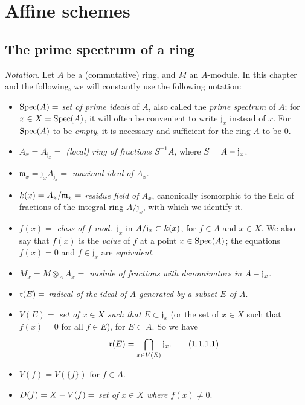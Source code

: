 \setcounter{section}{0}
\section{Affine schemes}
\label{section:I.1}

\setcounter{subsection}{0}
\subsection{The prime spectrum of a ring}
\label{subsection:I.1.1}

\begin{env}[1.1.1]
\label{I.1.1.1}
\emph{Notation}. Let $A$ be a (commutative) ring, and $M$ an $A$-module.
In this chapter and the following, we will constantly use the following notation:
\begin{itemize}
  \item $\operatorname{Spec}(A)=$ \emph{set of prime ideals} of $A$, also called the \emph{prime spectrum} of $A$; for $x\in X=\operatorname{Spec}(A)$, it will often be convenient to write $\mathfrak{j}_x$ instead of $x$.
    For $\operatorname{Spec}(A)$ to be \emph{empty}, it is necessary and sufficient for the ring $A$ to be $0$.
  \item $A_x=A_{\mathfrak{j}_x}=$ \emph{(local) ring of fractions $S^{-1}A$}, where $S=A-\mathfrak{j}_x$.
  \item $\mathfrak{m}_x=\mathfrak{j}_x A_{\mathfrak{j}_x}=$ \emph{maximal ideal of $A_x$}.
  \item $k(x)=A_x/\mathfrak{m}_x=$ \emph{residue field of $A_x$}, canonically isomorphic to the field of fractions of the integral ring $A/\mathfrak{j}_x$, with which we identify it.
  \item $f(x)=$ \emph{class of $f$ mod.~$\mathfrak{j}_x$} in $A/\mathfrak{j}_x\subset k(x)$, for $f\in A$ and $x\in X$.
    We also say that $f(x)$ is the \emph{value} of $f$ at a point $x\in\operatorname{Spec}(A)$; the equations $f(x)=0$ and $f\in\mathfrak{j}_x$ are \emph{equivalent}.
  \item $M_x=M\otimes_A A_x=$ \emph{module of fractions with denominators in $A-\mathfrak{j}_x$}.
  \item $\mathfrak{r}(E)=$ \emph{radical of the ideal of $A$ generated by a subset $E$ of $A$}.
  \item $V(E)=$ \emph{set of $x\in X$ such that $E\subset\mathfrak{j}_x$} (or the set of $x\in X$ such that $f(x)=0$ for all $f\in E$), for $E\subset A$.
    So we have
    \[
    \label{I.1.1.1.1}
      \mathfrak{r}(E)=\bigcap_{x\in V(E)}\mathfrak{j}_x.
      \tag{1.1.1.1}
    \]
  \item $V(f)=V(\{f\})$ for $f\in A$.
  \item $D(f)=X- V(f)=$ \emph{set of $x\in X$ where $f(x)\neq 0$}.
\end{itemize}
\end{env}

